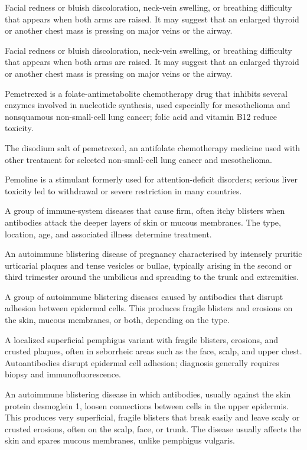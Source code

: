  Facial redness or bluish discoloration, neck-vein swelling, or breathing difficulty that appears when both arms are raised. It may suggest that an enlarged thyroid or another chest mass is pressing on major veins or the airway.

 Facial redness or bluish discoloration, neck-vein swelling, or breathing difficulty that appears when both arms are raised. It may suggest that an enlarged thyroid or another chest mass is pressing on major veins or the airway.

 Pemetrexed is a folate-antimetabolite chemotherapy drug that inhibits several enzymes involved in nucleotide synthesis, used especially for mesothelioma and nonsquamous non-small-cell lung cancer; folic acid and vitamin B12 reduce toxicity.

 The disodium salt of pemetrexed, an antifolate chemotherapy medicine used with other treatment for selected non-small-cell lung cancer and mesothelioma.

 Pemoline is a stimulant formerly used for attention-deficit disorders; serious liver toxicity led to withdrawal or severe restriction in many countries.

 A group of immune-system diseases that cause firm, often itchy blisters when antibodies attack the deeper layers of skin or mucous membranes. The type, location, age, and associated illness determine treatment.

 An autoimmune blistering disease of pregnancy characterised by intensely pruritic
urticarial plaques and tense vesicles or bullae, typically arising in the second or
third trimester around the umbilicus and spreading to the trunk and extremities.

 A group of autoimmune blistering diseases caused by antibodies that disrupt adhesion between epidermal cells. This produces fragile blisters and erosions on the skin, mucous membranes, or both, depending on the type.

 A localized superficial pemphigus variant with fragile blisters, erosions, and crusted plaques, often in seborrheic areas such as the face, scalp, and upper chest. Autoantibodies disrupt epidermal cell adhesion; diagnosis generally requires biopsy and immunofluorescence.

 An autoimmune blistering disease in which antibodies, usually against the skin protein desmoglein 1, loosen connections between cells in the upper epidermis. This produces very superficial, fragile blisters that break easily and leave scaly or crusted erosions, often on the scalp, face, or trunk. The disease usually affects the skin and spares mucous membranes, unlike pemphigus vulgaris.

